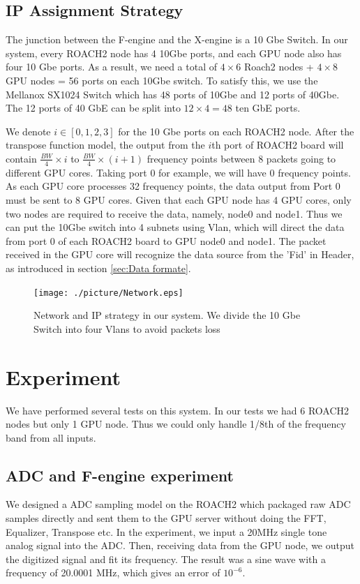 \documentclass{ws-jai}
\begin{document}
\subsection{IP Assignment Strategy\label{sec:IP assignment}}
The junction between the F-engine and the X-engine is a 10 Gbe Switch. In our system, every ROACH2 node has 4 10Gbe ports, and each GPU node also has four 10 Gbe ports. As a result, we need a total of $4\times 6 $ Roach2 nodes + $4 \times 8 $ GPU nodes = 56 ports on each 10Gbe switch. To satisfy this, we use the Mellanox SX1024 Switch which has 48 ports of 10Gbe and 12 ports of 40Gbe. The 12 ports of 40 GbE can be split into $12\times4=48$ ten GbE ports.

	We denote $i \in[0,1,2,3]$ for the 10 Gbe ports on each ROACH2 node. After the transpose function model, the output from the $i$th port of ROACH2 board will contain $\frac{BW}{4} \times i $ to $\frac{BW}{4} \times (i+1)$ frequency points between 8 packets going to different GPU cores. Taking port 0 for example, we will have 0 frequency points. As each GPU core processes 32 frequency points, the data output from Port 0 must be sent to 8 GPU cores. Given that each GPU node has 4 GPU cores, only two nodes are required to receive the data, namely, node0 and node1.  Thus we can put the 10Gbe switch into 4 subnets using Vlan, which will direct the data from port 0 of each ROACH2 board to GPU node0 and node1. The packet received in the GPU core will recognize the data source from the 'Fid' in Header, as introduced in section \ref{sec:Data formate}.
\begin{figure}[t]
 \centering
 \texttt{[image: ./picture/Network.eps]}
 \caption{Network and IP strategy in our system. We divide the 10 Gbe Switch into four Vlans to avoid packets loss}
\end{figure}

\section{Experiment}\label{sec:experiment}
We have performed several tests on this system. In our tests we had 6 ROACH2 nodes but only 1 GPU node. Thus we could only handle 1/8th of the frequency band from all inputs. 
\subsection{ADC and F-engine experiment}
We designed a ADC sampling model on the ROACH2 which packaged raw ADC samples directly and sent them to the GPU server without doing the FFT, Equalizer, Transpose etc. In the experiment, we input a 20MHz single tone analog signal into the ADC. Then, receiving data from the GPU node, we output the digitized signal and fit its frequency. The result was a sine wave with a frequency of 20.0001 MHz, which gives an error of $10^{-6}$. 
\end{document}
